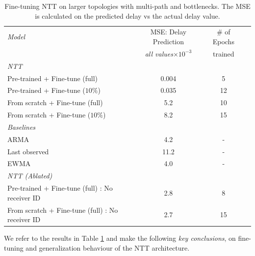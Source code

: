 \begin{table}[htbp]
\centering
\begin{tabular}{ l   c   c  c }
\toprule
\emph{Model} &  MSE: Delay Prediction & \# of Epochs    \\
			&		\emph{all values$\times10^{-3}$}  & trained 	\\ 
			

\midrule
\em{NTT}                                                               &       \\                                      
    \smallindent Pre-trained  +   Fine-tune (full)                                  & 0.004   &     5    \\                  
    \smallindent Pre-trained  +   Fine-tune ($10\%$)                                  & 0.035   & 12  \\                        
    \smallindent From scratch  + Fine-tune (full)                                       & 5.2    &   10 \\                      
     \smallindent From scratch  + Fine-tune ($10\%$)                                    & 8.2  & 15 \\                          
 \em{Baselines} &       \\  
    \smallindent ARMA  &       					4.2	& - \\  
    \smallindent Last observed &     				11.2	& -  \\  
    \smallindent  	EWMA &     					4.0	& -  \\  
\em{NTT (Ablated)}           &       \\       
     \smallindent Pre-trained  +   Fine-tune (full)  : No receiver ID                              & 2.8   &     8    \\   
      \smallindent From scratch  + Fine-tune (full) : No receiver ID                                  & 2.7    & 15  \\         
 
 \bottomrule

\end{tabular}
\caption{Fine-tuning NTT on larger topologies with multi-path and bottlenecks. The MSE is calculated on the predicted delay vs the actual delay value.}
\label{eval:table5}
\end{table}

We refer to the results in Table \ref{eval:table5} and make the following \emph{key conclusions}, on fine-tuning and generalization behaviour of the NTT architecture.

